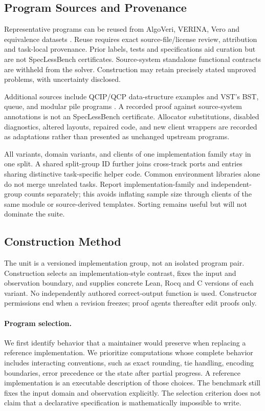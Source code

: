 \documentclass{article}
\begin{document}
\subsection{Program Sources and Provenance}

Representative programs can be reused from AlgoVeri, VERINA, Vero and equivalence datasets \citep{zhao2026algoveri,ye2026verina,ye2026vero,wei2025equibench,oza2026cetbench,badihi2021eqbench}. Reuse requires exact source-file/license review, attribution and task-local provenance. Prior labels, tests and specifications aid curation but are not SpecLessBench certificates. Source-system standalone functional contracts are withheld from the solver. Construction may retain precisely stated unproved problems, with uncertainty disclosed.

Additional sources include QCIP/QCP data-structure examples and VST's BST, queue, and modular pile programs \citep{qcp2026source,vst2026source}. A recorded proof against source-system annotations is not an SpecLessBench certificate. Allocator substitutions, disabled diagnostics, altered layouts, repaired code, and new client wrappers are recorded as adaptations rather than presented as unchanged upstream programs.

All variants, domain variants, and clients of one implementation family stay in one split. A shared split-group ID further joins cross-track ports and entries sharing distinctive task-specific helper code. Common environment libraries alone do not merge unrelated tasks. Report implementation-family and independent-group counts separately; this avoids inflating sample size through clients of the same module or source-derived templates. Sorting remains useful but will not dominate the suite.

\subsection{Construction Method}
\label{sec:construction}

The unit is a versioned implementation group, not an isolated program pair. Construction selects an implementation-style contrast, fixes the input and observation boundary, and supplies concrete Lean, Rocq and C versions of each variant. No independently authored correct-output function is used. Constructor permissions end when a revision freezes; proof agents thereafter edit proofs only.

\paragraph{Program selection.}
We first identify behavior that a maintainer would preserve when replacing a reference implementation. We prioritize computations whose complete behavior includes interacting conventions, such as exact rounding, tie handling, encoding boundaries, error precedence or the state after partial progress. A reference implementation is an executable description of those choices. The benchmark still fixes the input domain and observation explicitly. The selection criterion does not claim that a declarative specification is mathematically impossible to write.
\end{document}
